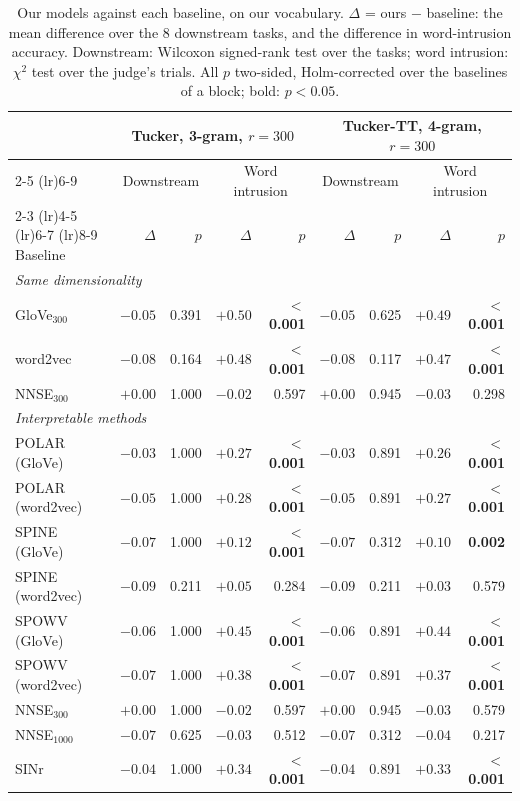 \begin{table}[t]
  \centering
  \small
  \begin{tabular}{lrrrrrrrr}
    \toprule
     & \multicolumn{4}{c}{Tucker, 3-gram, $r{=}300$} & \multicolumn{4}{c}{Tucker-TT, 4-gram, $r{=}300$} \\
    \cmidrule(lr){2-5} \cmidrule(lr){6-9}
     & \multicolumn{2}{c}{Downstream} & \multicolumn{2}{c}{Word intrusion} & \multicolumn{2}{c}{Downstream} & \multicolumn{2}{c}{Word intrusion} \\
    \cmidrule(lr){2-3} \cmidrule(lr){4-5} \cmidrule(lr){6-7} \cmidrule(lr){8-9}
    Baseline & $\Delta$ & $p$ & $\Delta$ & $p$ & $\Delta$ & $p$ & $\Delta$ & $p$ \\
    \midrule
    \multicolumn{9}{l}{\textit{Same dimensionality}} \\
    GloVe$_{300}$ & $-0.05$ & 0.391 & $+0.50$ & \textbf{$<$0.001} & $-0.05$ & 0.625 & $+0.49$ & \textbf{$<$0.001} \\
    word2vec & $-0.08$ & 0.164 & $+0.48$ & \textbf{$<$0.001} & $-0.08$ & 0.117 & $+0.47$ & \textbf{$<$0.001} \\
    NNSE$_{300}$ & $+0.00$ & 1.000 & $-0.02$ & 0.597 & $+0.00$ & 0.945 & $-0.03$ & 0.298 \\
    \midrule
    \multicolumn{9}{l}{\textit{Interpretable methods}} \\
    POLAR (GloVe) & $-0.03$ & 1.000 & $+0.27$ & \textbf{$<$0.001} & $-0.03$ & 0.891 & $+0.26$ & \textbf{$<$0.001} \\
    POLAR (word2vec) & $-0.05$ & 1.000 & $+0.28$ & \textbf{$<$0.001} & $-0.05$ & 0.891 & $+0.27$ & \textbf{$<$0.001} \\
    SPINE (GloVe) & $-0.07$ & 1.000 & $+0.12$ & \textbf{$<$0.001} & $-0.07$ & 0.312 & $+0.10$ & \textbf{0.002} \\
    SPINE (word2vec) & $-0.09$ & 0.211 & $+0.05$ & 0.284 & $-0.09$ & 0.211 & $+0.03$ & 0.579 \\
    SPOWV (GloVe) & $-0.06$ & 1.000 & $+0.45$ & \textbf{$<$0.001} & $-0.06$ & 0.891 & $+0.44$ & \textbf{$<$0.001} \\
    SPOWV (word2vec) & $-0.07$ & 1.000 & $+0.38$ & \textbf{$<$0.001} & $-0.07$ & 0.891 & $+0.37$ & \textbf{$<$0.001} \\
    NNSE$_{300}$ & $+0.00$ & 1.000 & $-0.02$ & 0.597 & $+0.00$ & 0.945 & $-0.03$ & 0.579 \\
    NNSE$_{1000}$ & $-0.07$ & 0.625 & $-0.03$ & 0.512 & $-0.07$ & 0.312 & $-0.04$ & 0.217 \\
    SINr & $-0.04$ & 1.000 & $+0.34$ & \textbf{$<$0.001} & $-0.04$ & 0.891 & $+0.33$ & \textbf{$<$0.001} \\
    \bottomrule
  \end{tabular}
  \caption{Our models against each baseline, on our vocabulary. $\Delta$ = ours $-$ baseline: the mean difference over the 8 downstream tasks, and the difference in word-intrusion accuracy. Downstream: Wilcoxon signed-rank test over the tasks; word intrusion: $\chi^2$ test over the judge's trials. All $p$ two-sided, Holm-corrected over the baselines of a block; bold: $p < 0.05$.}
  \label{tab:baseline-tests}
\end{table}

